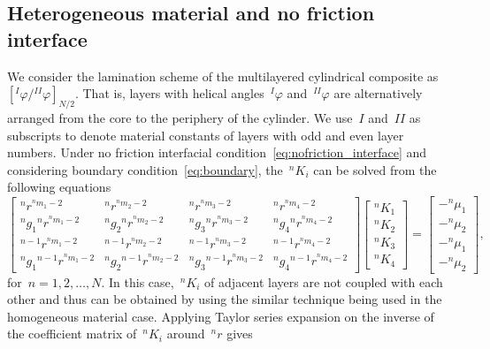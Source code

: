 \documentclass[preprint,10pt,times]{elsarticle}
\numberwithin{equation}{section}
\renewcommand{\>}{$\Rightarrow$}
\begin{document}
\subsection{Heterogeneous material and no friction interface}
\label{sec:2mat_no_friction}
We consider the lamination scheme of the multilayered cylindrical composite as~$[{}^{I}\!\varphi/{}^{II}\!\varphi]_{N/2}$. That is, layers with helical angles~${}^{I}\!\varphi$ and~${}^{II}\!\varphi$ are alternatively arranged from the core to the periphery of the cylinder. We use~$I$ and~$II$ as subscripts to denote material constants of layers with odd and even layer numbers.
Under no friction interfacial condition~\eqref{eq:nofriction_interface} and considering boundary condition~\eqref{eq:boundary}, the~${}^{n}\!{K_{i}}$ can be solved from the following equations
\begin{equation}
	\begin{bmatrix}
		{}^{n}\!{r}^{{}^{n}\!{m_{1}} - 2} & {}^{n}\!{r}^{{}^{n}\!{m_{2}} - 2} & {}^{n}\!{r}^{{}^{n}\!{m_{3}} - 2} & {}^{n}\!{r}^{{}^{n}\!{m_{4}} - 2} \\
		{}^{n}\!{g_{1}} {}^{n}\!{r}^{{}^{n}\!{m_{1}} - 2} & {}^{n}\!{g_{2}} {}^{n}\!{r}^{{}^{n}\!{m_{2}} - 2} & {}^{n}\!{g_{3}} {}^{n}\!{r}^{{}^{n}\!{m_{3}} - 2} & {}^{n}\!{g_{4}} {}^{n}\!{r}^{{}^{n}\!{m_{4}} - 2} \\
		{}^{n-1}\!{r}^{{}^{n}\!{m_{1}} - 2} & {}^{n-1}\!{r}^{{}^{n}\!{m_{2}} - 2} & {}^{n-1}\!{r}^{{}^{n}\!{m_{3}} - 2} & {}^{n-1}\!{r}^{{}^{n}\!{m_{4}} - 2} \\
		{}^{n}\!{g_{1}} {}^{n-1}\!{r}^{{}^{n}\!{m_{1}} - 2} & {}^{n}\!{g_{2}} {}^{n-1}\!{r}^{{}^{n}\!{m_{2}} - 2} & {}^{n}\!{g_{3}} {}^{n-1}\!{r}^{{}^{n}\!{m_{3}} - 2} & {}^{n}\!{g_{4}} {}^{n-1}\!{r}^{{}^{n}\!{m_{4}} - 2}
	\end{bmatrix}
	\begin{bmatrix}
		{}^{n}\!{K_{1}} \\ {}^{n}\!{K_{2}} \\ {}^{n}\!{K_{3}} \\ {}^{n}\!{K_{4}}
	\end{bmatrix}
	=
	\begin{bmatrix}
		-{}^{n}\!{\mu_{1}} \\ -{}^{n}\!{\mu_{2}} \\ -{}^{n}\!{\mu_{1}} \\ -{}^{n}\!{\mu_{2}}
	\end{bmatrix},
	\label{eq:eqs of Kin_two_mat_no_friction}
\end{equation}
for~$n = 1,2,\dots,N$. In this case,~${}^{n}\!{K_{i}}$ of adjacent layers are not coupled with each other and thus can be obtained by using the similar technique being used in the homogeneous material case. Applying Taylor series expansion on the inverse of the coefficient matrix of~${}^{n}\!{K_{i}}$ around~${}^{n}\!{r}$ gives
\end{document}
